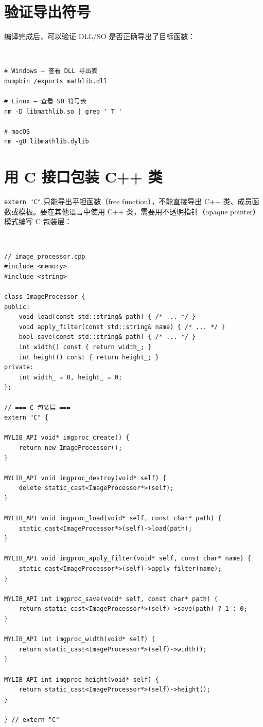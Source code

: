 \documentclass[12pt,a4paper,fontset=fandol]{ctexbook}
\newcommand{\cpplabel}{%
  \begin{tcolorbox}[enhanced,colback=cppheadbg,colframe=cppheadbg,
    arc=1mm,boxrule=0mm,left=6pt,right=6pt,top=2pt,bottom=2pt,
    halign=left,oversize]
    \textcolor{white}{\small\bfseries C++}
  \end{tcolorbox}\vspace{-4pt}}
\newcommand{\bashlabel}{%
  \begin{tcolorbox}[enhanced,colback=black!80,colframe=black!80,
    arc=1mm,boxrule=0mm,left=6pt,right=6pt,top=2pt,bottom=2pt,
    halign=left,oversize]
    \textcolor{white}{\small\bfseries Shell}
  \end{tcolorbox}\vspace{-4pt}}
\newcommand{\cpp}[1]{C++#1}
\begin{document}
\section{验证导出符号}

编译完成后，可以验证 DLL/SO 是否正确导出了目标函数：

\bashlabel
\begin{lstlisting}[style=bashstyle]
# Windows — 查看 DLL 导出表
dumpbin /exports mathlib.dll

# Linux — 查看 SO 符号表
nm -D libmathlib.so | grep ' T '

# macOS
nm -gU libmathlib.dylib
\end{lstlisting}

\section{用 C 接口包装 C++ 类}

\texttt{extern "C"} 只能导出平坦函数（free function），不能直接导出 \cpp{} 类、成员函数或模板。要在其他语言中使用 \cpp{} 类，需要用不透明指针（opaque pointer）模式编写 C 包装层：

\cpplabel
\begin{lstlisting}[style=cppstyle]
// image_processor.cpp
#include <memory>
#include <string>

class ImageProcessor {
public:
    void load(const std::string& path) { /* ... */ }
    void apply_filter(const std::string& name) { /* ... */ }
    bool save(const std::string& path) { /* ... */ }
    int width() const { return width_; }
    int height() const { return height_; }
private:
    int width_ = 0, height_ = 0;
};

// === C 包装层 ===
extern "C" {

MYLIB_API void* imgproc_create() {
    return new ImageProcessor();
}

MYLIB_API void imgproc_destroy(void* self) {
    delete static_cast<ImageProcessor*>(self);
}

MYLIB_API void imgproc_load(void* self, const char* path) {
    static_cast<ImageProcessor*>(self)->load(path);
}

MYLIB_API void imgproc_apply_filter(void* self, const char* name) {
    static_cast<ImageProcessor*>(self)->apply_filter(name);
}

MYLIB_API int imgproc_save(void* self, const char* path) {
    return static_cast<ImageProcessor*>(self)->save(path) ? 1 : 0;
}

MYLIB_API int imgproc_width(void* self) {
    return static_cast<ImageProcessor*>(self)->width();
}

MYLIB_API int imgproc_height(void* self) {
    return static_cast<ImageProcessor*>(self)->height();
}

} // extern "C"
\end{lstlisting}
\end{document}
